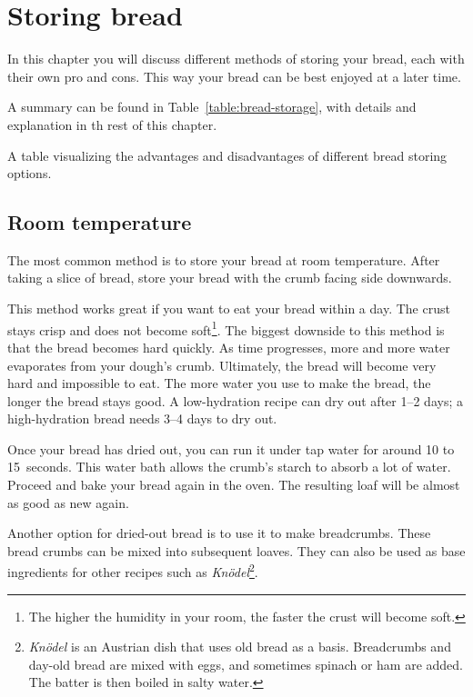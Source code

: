 \chapter{Storing bread}%
\label{chapter:storing-bread}
\begin{quoting}
In this chapter you will discuss different methods of storing your bread, each
with their own pro and cons.  This way your bread can be best enjoyed at a
later time.
\end{quoting}

A summary can be found in Table~\ref{table:bread-storage}, with details and
explanation in th rest of this chapter.
\begin{table}[!htb]
    \begin{center}
        
        \caption[Options to store bread]{A table visualizing the advantages
            and disadvantages of different bread storing options.}%
        \label{table:bread-storage}
    \end{center}
\end{table}

\section{Room temperature}

The most common method is to store your bread
at room temperature. After taking a slice of bread,
store your bread with the crumb facing side
downwards.

This method works great if you want to eat
your bread within a day. The crust stays
crisp and does not become soft\footnote{The higher the humidity in your room,
    the faster the crust will become soft.}.
The biggest downside to this method is that
the bread becomes hard quickly. As time progresses,
more and more water evaporates from your dough's
crumb. Ultimately, the bread will become very hard
and impossible to eat. The more water you use
to make the bread, the longer the bread stays good.
A low-hydration recipe can dry out after 1--2 days;
a high-hydration bread needs 3--4 days to dry out.

Once your bread has dried out, you can run it under
tap water for around 10 to 15~seconds.
This water bath allows the
crumb's starch to absorb a lot of water. Proceed and
bake your bread again in the oven. The resulting loaf
will be almost as good as new again.

Another option for dried-out bread is to use it
to make breadcrumbs. These bread crumbs can be mixed
into subsequent loaves. They can also be used as
base ingredients for other recipes such as \emph{Knödel}\footnote{\emph{Knödel} is an
    Austrian dish that uses old bread as a basis.
  Breadcrumbs and day-old bread are mixed with eggs, and sometimes
  spinach or ham are added. The batter is then boiled in salty water.
}.

